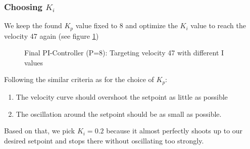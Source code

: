 \subsubsection*{Choosing $K_i$}
We keep the found $K_p$ value fixed to 8 and optimize the $K_i$ value to reach the velocity 47 again (see figure \ref{fig:I_final})

\begin{figure}[H]
    \centering
{}
    \caption{Final PI-Controller (P=8): Targeting velocity 47 with different I values} \label{fig:I_final}
\end{figure}

Following the similar criteria as for the choice of $K_p$:
\begin{enumerate}
    \item The velocity curve should overshoot the setpoint as little as possible
    \item The oscillation around the setpoint should be as small as possible.
\end{enumerate}
Based on that, we pick $K_i = 0.2$ because it almost perfectly shoots up to our desired setpoint and stops there without oscillating too strongly.

